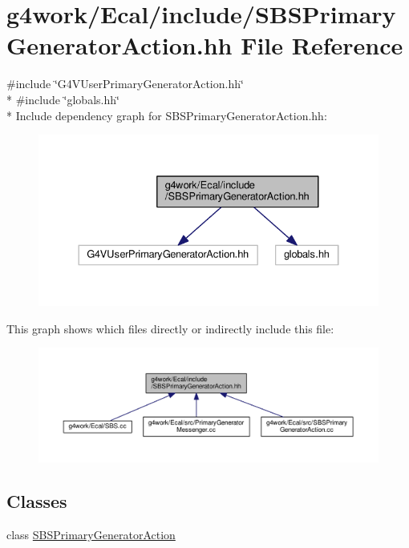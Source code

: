 \hypertarget{_s_b_s_primary_generator_action_8hh}{\section{g4work/\-Ecal/include/\-S\-B\-S\-Primary\-Generator\-Action.hh File Reference}
\label{_s_b_s_primary_generator_action_8hh}
}
{\ttfamily \#include \char`\"{}G4\-V\-User\-Primary\-Generator\-Action.\-hh\char`\"{}}\\*
{\ttfamily \#include \char`\"{}globals.\-hh\char`\"{}}\\*
Include dependency graph for S\-B\-S\-Primary\-Generator\-Action.\-hh\-:\nopagebreak
\begin{figure}[H]
\begin{center}
\leavevmode
\includegraphics[width=333pt]{_s_b_s_primary_generator_action_8hh__incl}
\end{center}
\end{figure}
This graph shows which files directly or indirectly include this file\-:\nopagebreak
\begin{figure}[H]
\begin{center}
\leavevmode
\includegraphics[width=350pt]{_s_b_s_primary_generator_action_8hh__dep__incl}
\end{center}
\end{figure}
\subsection*{Classes}
\begin{DoxyCompactItemize}
\item 
class \hyperlink{class_s_b_s_primary_generator_action}{S\-B\-S\-Primary\-Generator\-Action}
\end{DoxyCompactItemize}

